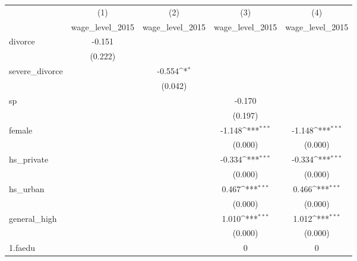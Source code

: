 {
\def\sym#1{\ifmmode^{#1}\else\(^{#1}\)\fi}
\begin{tabular}{l*{4}{c}}
\hline\hline
            &\multicolumn{1}{c}{(1)}&\multicolumn{1}{c}{(2)}&\multicolumn{1}{c}{(3)}&\multicolumn{1}{c}{(4)}\\
            &\multicolumn{1}{c}{wage\_level\_2015}&\multicolumn{1}{c}{wage\_level\_2015}&\multicolumn{1}{c}{wage\_level\_2015}&\multicolumn{1}{c}{wage\_level\_2015}\\
\hline
divorce     &      -0.151         &                     &                     &                     \\
            &     (0.222)         &                     &                     &                     \\
[1em]
severe\_divorce&                     &      -0.554\sym{*}  &                     &                     \\
            &                     &     (0.042)         &                     &                     \\
[1em]
sp          &                     &                     &      -0.170         &                     \\
            &                     &                     &     (0.197)         &                     \\
[1em]
female      &                     &                     &      -1.148\sym{***}&      -1.148\sym{***}\\
            &                     &                     &     (0.000)         &     (0.000)         \\
[1em]
hs\_private  &                     &                     &      -0.334\sym{***}&      -0.334\sym{***}\\
            &                     &                     &     (0.000)         &     (0.000)         \\
[1em]
hs\_urban    &                     &                     &       0.467\sym{***}&       0.466\sym{***}\\
            &                     &                     &     (0.000)         &     (0.000)         \\
[1em]
general\_high&                     &                     &       1.010\sym{***}&       1.012\sym{***}\\
            &                     &                     &     (0.000)         &     (0.000)         \\
[1em]
1.faedu     &                     &                     &           0         &           0         \\

\end{tabular}}
